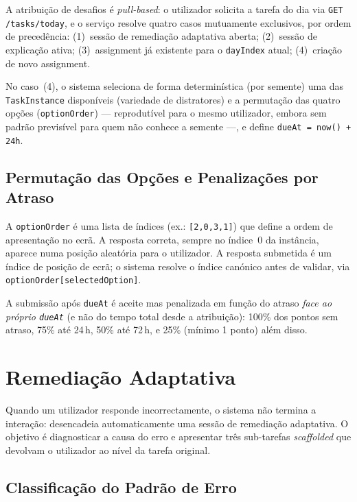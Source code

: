 A atribuição de desafios é \textit{pull-based}: o utilizador solicita a tarefa do dia via \texttt{GET /tasks/today}, e o serviço resolve quatro casos mutuamente exclusivos, por ordem de precedência: (1)~sessão de remediação adaptativa aberta; (2)~sessão de explicação ativa; (3)~assignment já existente para o \texttt{dayIndex} atual; (4)~criação de novo assignment.

No caso~(4), o sistema seleciona de forma determinística (por semente) uma das \texttt{TaskInstance} disponíveis (variedade de distratores) e a permutação das quatro opções (\texttt{optionOrder}) --- reprodutível para o mesmo utilizador, embora sem padrão previsível para quem não conhece a semente ---, e define \texttt{dueAt = now() + 24h}.

\subsection*{Permutação das Opções e Penalizações por Atraso}

A \texttt{optionOrder} é uma lista de índices (ex.: \texttt{[2,0,3,1]}) que define a ordem de apresentação no ecrã.
A resposta correta, sempre no índice~0 da instância, aparece numa posição aleatória para o utilizador.
A resposta submetida é um índice de posição de ecrã; o sistema resolve o índice canónico antes de validar, via \texttt{optionOrder[selectedOption]}.

A submissão após \texttt{dueAt} é aceite mas penalizada em função do atraso \textit{face ao próprio \texttt{dueAt}} (e não do tempo total desde a atribuição): 100\% dos pontos sem atraso, 75\% até 24\,h, 50\% até 72\,h, e 25\% (mínimo 1 ponto) além disso.

\section{Remediação Adaptativa} \label{sec:consolidation}

Quando um utilizador responde incorrectamente, o sistema não termina a interação: desencadeia automaticamente uma sessão de remediação adaptativa.
O objetivo é diagnosticar a causa do erro e apresentar três sub-tarefas \textit{scaffolded} que devolvam o utilizador ao nível da tarefa original.

\subsection*{Classificação do Padrão de Erro}

